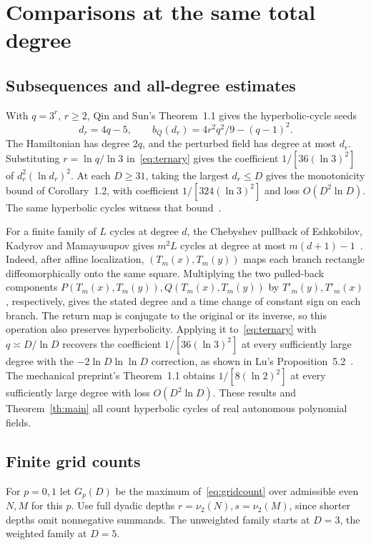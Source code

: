 \section{Comparisons at the same total degree}\label{sec:comparison}

\subsection{Subsequences and all-degree estimates}
With \(q=3^r\), \(r\ge2\), Qin and Sun's Theorem~1.1 gives the hyperbolic-cycle seeds
\begin{equation}\label{eq:ternary}
 d_r=4q-5,\qquad b_Q(d_r)=4r^2q^2/9-(q-1)^2 .
\end{equation}
The Hamiltonian has degree \(2q\), and the perturbed field has degree at most \(d_r\). Substituting \(r=\ln q/\ln3\) in~\eqref{eq:ternary} gives the coefficient \(1/[36(\ln3)^2]\) of \(d_r^2(\ln d_r)^2\). At each \(D\ge31\), taking the largest \(d_r\le D\) gives the monotonicity bound of Corollary~1.2, with coefficient \(1/[324(\ln3)^2]\) and loss \(O(D^2\ln D)\). The same hyperbolic cycles witness that bound~\cite[Theorem 1.1, Corollary 1.2 and \S6]{qin}.

For a finite family of \(L\) cycles at degree \(d\), the Chebyshev pullback of Eshkobilov, Kadyrov and Mamayusupov gives \(m^2L\) cycles at degree at most \(m(d+1)-1\)~\cite[Theorem 1]{replication}. Indeed, after affine localization, \((T_m(x),T_m(y))\) maps each branch rectangle diffeomorphically onto the same square. Multiplying the two pulled-back components \(P(T_m(x),T_m(y)),Q(T_m(x),T_m(y))\) by \(T'_m(y),T'_m(x)\), respectively, gives the stated degree and a time change of constant sign on each branch. The return map is conjugate to the original or its inverse, so this operation also preserves hyperbolicity. Applying it to~\eqref{eq:ternary} with \(q\asymp D/\ln D\) recovers the coefficient \(1/[36(\ln3)^2]\) at every sufficiently large degree with the \(-2\ln D\ln\ln D\) correction, as shown in Lu's Proposition~5.2~\cite{mechanical}. The mechanical preprint's Theorem~1.1 obtains \(1/[8(\ln2)^2]\) at every sufficiently large degree with loss \(O(D^2\ln D)\). These results and Theorem~\ref{th:main} all count hyperbolic cycles of real autonomous polynomial fields.

\subsection{Finite grid counts}
For \(p=0,1\) let \(G_p(D)\) be the maximum of~\eqref{eq:gridcount} over admissible even \(N,M\) for this \(p\). Use full dyadic depths \(r=\nu_2(N),s=\nu_2(M)\), since shorter depths omit nonnegative summands. The unweighted family starts at \(D=3\), the weighted family at \(D=5\).

